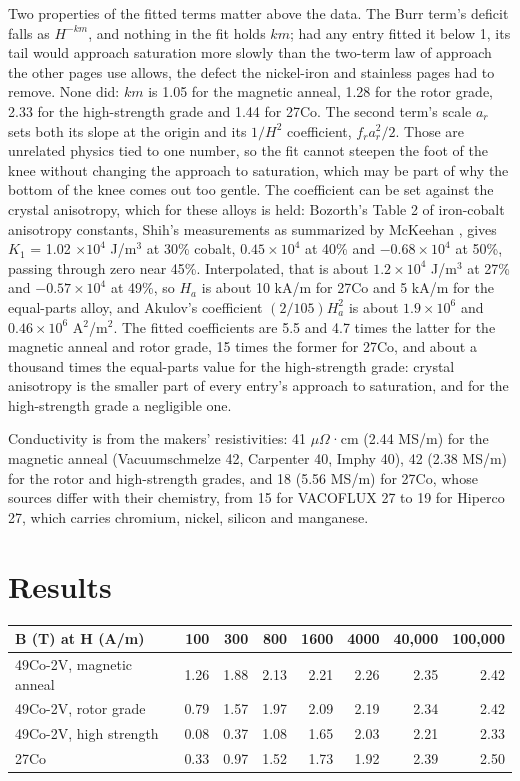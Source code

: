 \documentclass[
  11pt,
]{article}
\begin{document}
Two properties of the fitted terms matter above the data. The Burr term's deficit falls as \(H^{-km}\), and nothing in the fit holds \(km\); had any entry fitted it below 1, its tail would approach saturation more slowly than the two-term law of approach the other pages use allows, the defect the nickel-iron and stainless pages had to remove. None did: \(km\) is 1.05 for the magnetic anneal, 1.28 for the rotor grade, 2.33 for the high-strength grade and 1.44 for 27Co. The second term's scale \(a_r\) sets both its slope at the origin and its \(1/H^{2}\) coefficient, \(f_r a_r^{2}/2\). Those are unrelated physics tied to one number, so the fit cannot steepen the foot of the knee without changing the approach to saturation, which may be part of why the bottom of the knee comes out too gentle. The coefficient can be set against the crystal anisotropy, which for these alloys is held: Bozorth's Table 2 of iron-cobalt anisotropy constants, Shih's measurements as summarized by McKeehan \cite{bozorth1951}, gives \(K_1\) = 1.02 \(\times 10^{4}\) J/m\(^3\) at 30\% cobalt, \(0.45\times10^{4}\) at 40\% and \(-0.68\times10^{4}\) at 50\%, passing through zero near 45\%. Interpolated, that is about \(1.2\times10^{4}\) J/m\(^3\) at 27\% and \(-0.57\times10^{4}\) at 49\%, so \(H_a\) is about 10 kA/m for 27Co and 5 kA/m for the equal-parts alloy, and Akulov's coefficient \((2/105)H_a^{2}\) is about \(1.9\times10^{6}\) and \(0.46\times10^{6}\) A\(^2\)/m\(^2\). The fitted coefficients are 5.5 and 4.7 times the latter for the magnetic anneal and rotor grade, 15 times the former for 27Co, and about a thousand times the equal-parts value for the high-strength grade: crystal anisotropy is the smaller part of every entry's approach to saturation, and for the high-strength grade a negligible one.

Conductivity is from the makers' resistivities: 41 \(\mu\Omega\)·cm (2.44 MS/m) for the magnetic anneal (Vacuumschmelze 42, Carpenter 40, Imphy 40), 42 (2.38 MS/m) for the rotor and high-strength grades, and 18 (5.56 MS/m) for 27Co, whose sources differ with their chemistry, from 15 for VACOFLUX 27 to 19 for Hiperco 27, which carries chromium, nickel, silicon and manganese.

\section{Results}\label{results}

\begin{center}
\begin{tabular}{lrrrrrrr}
\toprule
B (T) at H (A/m) & 100 & 300 & 800 & 1600 & 4000 & 40,000 & 100,000 \\
\midrule
49Co-2V, magnetic anneal & 1.26 & 1.88 & 2.13 & 2.21 & 2.26 & 2.35 & 2.42 \\
49Co-2V, rotor grade & 0.79 & 1.57 & 1.97 & 2.09 & 2.19 & 2.34 & 2.42 \\
49Co-2V, high strength & 0.08 & 0.37 & 1.08 & 1.65 & 2.03 & 2.21 & 2.33 \\
27Co & 0.33 & 0.97 & 1.52 & 1.73 & 1.92 & 2.39 & 2.50 \\
\bottomrule
\end{tabular}
\end{center}
\end{document}
